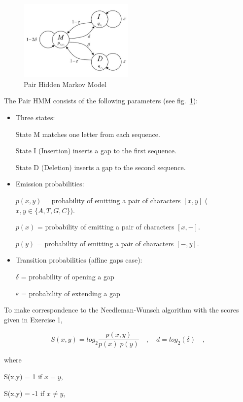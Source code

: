 \documentclass[a4paper,11pt]{article}
\begin{document}
\begin{figure}[h]
\begin{center}
\includegraphics[width=0.5\textwidth]{HMM.jpg}
\caption{Pair Hidden Markov Model}
\label{fig:HMM}
\end{center}
\end{figure}


The Pair HMM consists of the following parameters (see fig.~\ref{fig:HMM}):

\begin{itemize}
\item Three states:

State M matches one letter from each sequence.

State I (Insertion) inserts a gap to the first sequence.

State D (Deletion) inserts a gap to the second sequence.

\item Emission probabilities:

$p(x,y)$ = probability of emitting a pair of characters $[x,y]$ ($x,y \in \{A,T,G,C\}$).

$p(x)$ = probability of emitting a pair of characters $[x,-]$.

$p(y)$ = probability of emitting a pair of characters $[-,y]$.

\item Transition probabilities (affine gaps case):

$\delta$ = probability of opening a gap

$\varepsilon$ = probability of extending a gap
\end{itemize}

To make correspondence to the Needleman-Wunsch algorithm with the scores given in Exercise 1,


$$S(x,y)=log_2\frac{p(x,y)}{p(x)\; p(y)} \quad , \quad d=log_2(\delta) \quad ,$$


where

S(x,y) = 1 if $x=y$, 

S(x,y) = -1 if $x\neq y$,
\end{document}
